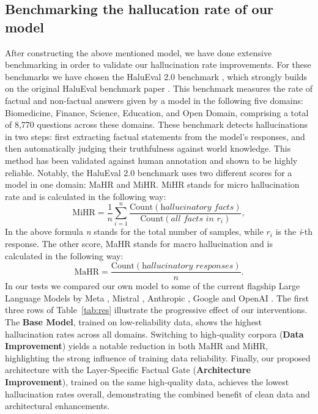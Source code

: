 \subsection{Benchmarking the hallucation rate of our model}


After constructing the above mentioned model, we have done extensive benchmarking in order to validate our hallucination rate improvements. For these benchmarks we have chosen the HaluEval 2.0 benchmark \cite{li2024dawn}, which strongly builds on the original HaluEval benchmark paper \cite{li2023halueval}. This benchmark measures the rate of factual and non-factual answers given by a model in the following five domains: Biomedicine, Finance, Science, Education, and Open Domain, comprising a total of 8,770 questions across these domains. These benchmark detects hallucinations in two steps: first extracting factual statements from the model’s responses, and then automatically judging their truthfulness against world knowledge. This method has been validated against human annotation and shown to be highly reliable. Notably, the HaluEval 2.0 benchmark uses two different scores for a model in one domain: MaHR and MiHR. MiHR stands for micro hallucination rate and is calculated in the following way: 
\[
\text{MiHR} = \frac{1}{n} \sum_{i=1}^{n} 
\frac{\text{Count}(\textit{hallucinatory facts})}
{\text{Count}(\textit{all facts in } r_i)},
\]
In the above formula \textit{n} stands for the total number of samples, while $r_i$ is the \textit{i}-th response. The other score, MaHR stands for macro hallucination and is calculated in the following way:
\[
\text{MaHR} = \frac{\text{Count}(\textit{hallucinatory responses})}{n}.
\]
In our tests we compared our own model to some of the current flagship Large Language Models by Meta \cite{Llama}, Mistral \cite{Mistral}, Anthropic \cite{Anthropic}, Google \cite{Gemini} and OpenAI \cite{OpenAI}.
The first three rows of Table~\ref{tab:res} illustrate the progressive effect of our interventions. The \textbf{Base Model}, trained on low-reliability data, shows the highest hallucination rates across all domains. Switching to high-quality corpora (\textbf{Data Improvement}) yields a notable reduction in both MaHR and MiHR, highlighting the strong influence of training data reliability. Finally, our proposed architecture with the Layer-Specific Factual Gate (\textbf{Architecture Improvement}), trained on the same high-quality data, achieves the lowest hallucination rates overall, demonstrating the combined benefit of clean data and architectural enhancements.



